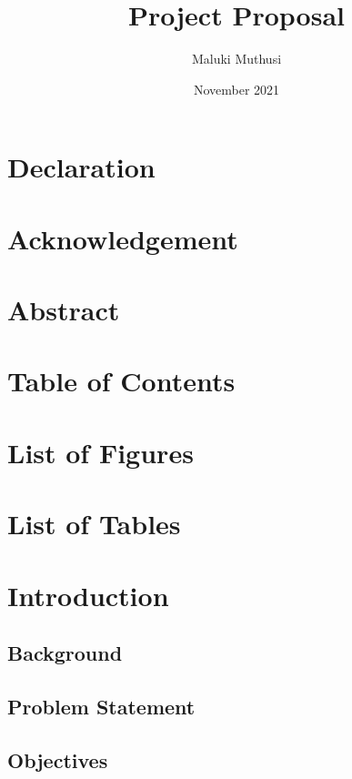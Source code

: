 \documentclass{report}
\title{Project Proposal}
\author{Maluki Muthusi}
\date{November 2021}
\begin{document}


%
\section{Declaration}

\newpage

%
\section{Acknowledgement}

\newpage

%
\section{Abstract}

\newpage


%
\section{Table of Contents}

%
\section{List of Figures}

%
\section{List of Tables}


\section{Introduction}


\subsection{Background}


\subsection{Problem Statement}


\subsection{Objectives}

\end{document}
